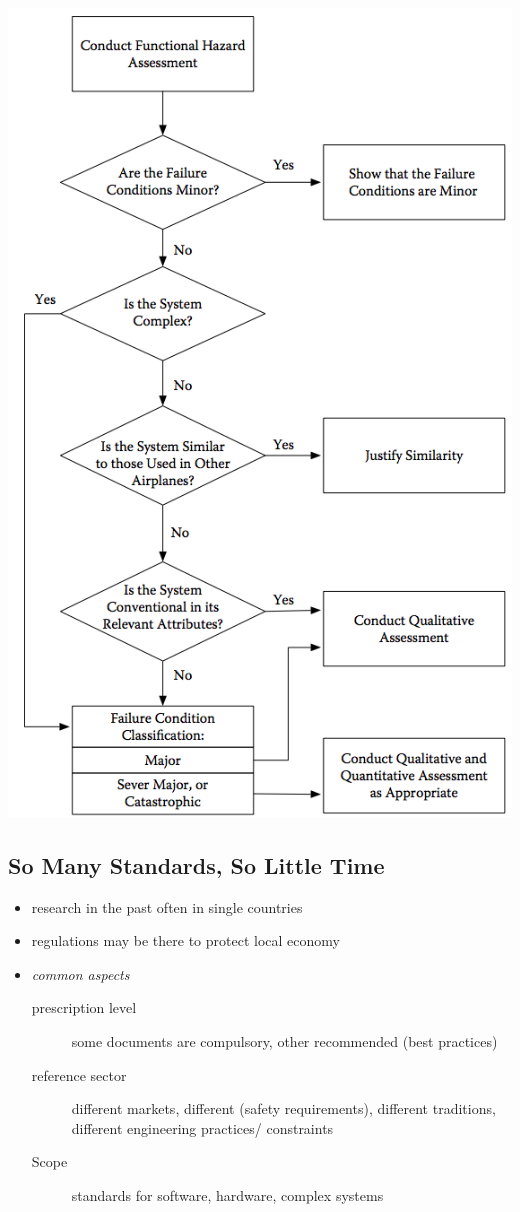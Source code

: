\documentclass[a4paper, 10pt]{article}
\begin{document}
\begin{center}
    \includegraphics[width=.5\linewidth]{images/complianceFlow.png}
\end{center}

\subsection*{So Many Standards, So Little Time}
\begin{itemize}
    \item research in the past often in single countries
    \item regulations may be there to protect local economy
    \item \emph{common aspects}
    \begin{description}
        \item[prescription level] some documents are compulsory, other recommended (best practices)
        \item[reference sector] different markets, different (safety requirements), different traditions, different engineering practices/ constraints
        \item[Scope] standards for software, hardware, complex systems
    \end{description}
\end{itemize}
\end{document}
